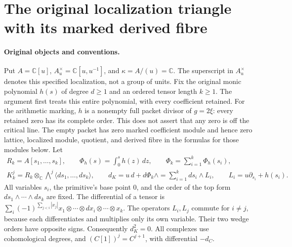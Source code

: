 \section{The original localization triangle with its marked derived fibre}
\label{sec:MLT}

\paragraph{Original objects and conventions.}
Put \(A=\mathbb C[u]\), \(A^\times_u=\mathbb C[u,u^{-1}]\),
and \(\kappa=A/(u)=\mathbb C\). The superscript in
\(A^\times_u\) denotes this specified localization, not a group
of units. Fix the original monic polynomial \(h(s)\) of degree
\(d\ge1\) and an ordered tensor length \(k\ge1\). The argument
first treats this entire polynomial, with every coefficient retained.
For the arithmetic marking, \(h\) is a nonempty full packet divisor
of \(g=2\xi\): every retained zero has its complete order.
This does not assert that any zero is off the critical line.
The empty packet has zero marked coefficient module and hence zero
lattice, localized module, quotient, and derived fibre in the
formulas for those modules below.
Let
\[
 \begin{gathered}
 R_k=A[s_1,\ldots,s_k],\qquad
 \Phi_h(s)=\int_0^s h(z)\,dz,\qquad
 \Phi_k=\sum_{i=1}^k\Phi_h(s_i),\\
 K_k^j=R_k\otimes_{\mathbb C}\bigwedge\nolimits^j
       \langle ds_1,\ldots,ds_k\rangle,\qquad
 d_K=u\,d+d\Phi_k\wedge
       =\sum_{i=1}^k ds_i\wedge L_i,\qquad
 L_i=u\partial_{s_i}+h(s_i).
 \end{gathered}                                             \tag{MLT.1}
\]
All variables \(s_i\), the primitive's base point \(0\), and the
order of the top form \(ds_1\wedge\cdots\wedge ds_k\) are fixed.
The differential of a tensor is
\(\sum_i(-1)^{\sum_{j<i}|x_j|}
x_1\otimes\cdots\otimes d x_i\otimes\cdots\otimes x_k\).
The operators \(L_i,L_j\) commute for \(i\ne j\), because
each differentiates and multiplies only its own variable.
Their two wedge orders have opposite signs. Consequently
\(d_K^2=0\). All complexes use cohomological degrees, and
\((C[1])^j=C^{j+1}\), with differential \(-d_C\).

